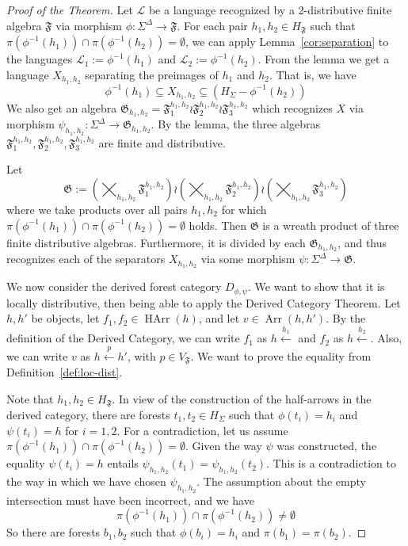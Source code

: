 \documentclass[sigplan,9pt]{acmart}\settopmatter{printfolios=true,printccs=false,printacmref=false}
\theoremstyle{definition}
\newcommand{\La}[0]{{\mathcal{L}}}
\newcommand{\Ff}[0]{{\mathfrak{F}}}
\newcommand{\Gg}[0]{{\mathfrak{G}}}
\newcommand{\carrow}[3]{#3 \xleftarrow{#2} #1 }
\newcommand{\HArr}[0]{{\operatorname{HArr}}}
\newcommand{\Arr}[0]{{\operatorname{Arr}}}
\begin{document}
\begin{proof}[Proof of the Theorem]
Let $\La$ be a language recognized by a 2-distributive finite algebra $\Ff$ via morphism $\phi : \Sigma^\Delta \rightarrow \Ff$.
For each pair $h_1, h_2 \in H_\Ff$ such that $\pi(\phi^{-1}(h_1)) \cap \pi(\phi^{-1}(h_2)) = \emptyset$, we can apply Lemma~\ref{cor:separation} to the languages $\La_1 := \phi^{-1}(h_1)$ and $\La_2 := \phi^{-1}(h_2)$.
From the lemma we get a language $X_{h_1,h_2}$ separating the preimages of $h_1$ and $h_2$.
That is, we have
$$\phi^{-1}(h_1) \subseteq X_{h_1,h_2} \subseteq (H_\Sigma - \phi^{-1}(h_2))$$
We also get an algebra $\Gg_{h_1, h_2} = \Ff_1^{h_1,h_2} \wr \Ff_2^{h_1,h_2} \wr \Ff_3^{h_1,h_2}$ which recognizes $X$ via morphism $\psi_{h_1, h_2} : \Sigma^\Delta \rightarrow \Gg_{h_1, h_2}$.
By the lemma, the three algebras $\Ff_1^{h_1,h_2}, \Ff_2^{h_1,h_2}, \Ff_3^{h_1,h_2}$ are finite and distributive.



Let $$\Gg := \left(\bigtimes_{h_1, h_2} \Ff_1^{h_1, h_2}\right) \wr \left(\bigtimes_{h_1, h_2} \Ff_2^{h_1, h_2}\right) \wr \left(\bigtimes_{h_1, h_2} \Ff_3^{h_1, h_2}\right)$$
where we take products over all pairs $h_1, h_2$ for which $\pi(\phi^{-1}(h_1)) \cap \pi(\phi^{-1}(h_2)) = \emptyset$ holds.
Then $\Gg$ is a wreath product of three finite distributive algebras.
Furthermore, it is divided by each $\Gg_{h_1, h_2}$, and thus recognizes each of the separators $X_{h_1, h_2}$ via some morphism $\psi : \Sigma^\Delta \rightarrow \Gg$.


We now consider the derived forest category $D_{\phi,\psi}$.
We want to show that it is locally distributive, then being able to apply the Derived Category Theorem.
Let $h, h'$ be objects, let $f_1, f_2 \in \HArr(h)$, and let $v \in \Arr(h,h')$.
By the definition of the Derived Category, we can write $f_1$ as $\carrow{}{h_1}h$ and $f_2$ as $\carrow{}{h_2}h$.
Also, we can write $v$ as $\carrow{h}{p} h'$, with $p \in V_\Ff$.
We want to prove the equality from Definition~\ref{def:loc-dist}.


Note that $h_1, h_2 \in H_\Ff$.
In view of the construction of the half-arrows in the derived category, there are forests $t_1, t_2 \in H_\Sigma$ such that $\phi(t_i) = h_i$ and $\psi(t_i) = h$ for $i=1,2$.
For a contradiction, let us assume $\pi(\phi^{-1}(h_1)) \cap \pi(\phi^{-1}(h_2)) = \emptyset$.
Given the way $\psi$ was constructed, the equality $\psi(t_i) = h$ entails $\psi_{h_1, h_2}(t_1) =\psi_{h_1, h_2}(t_2)$.
This is a contradiction to the way in which we have chosen $\psi_{h_1,h_2}$.
The assumption about the empty intersection must have been incorrect, and we have
$$\pi(\phi^{-1}(h_1)) \cap \pi(\phi^{-1}(h_2)) \neq \emptyset$$
So there are forests $b_1, b_2$ such that $\phi(b_i) = h_i$ and $\pi(b_1) = \pi(b_2)$.


\end{proof}
\end{document}
